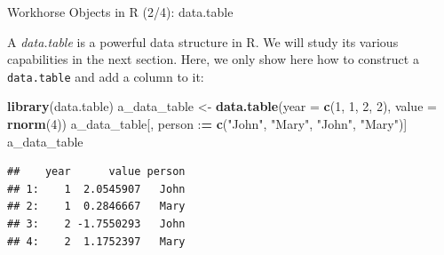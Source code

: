 \documentclass[10pt,ignorenonframetext,]{beamer}
\newenvironment{Shaded}{\begin{snugshade}}{\end{snugshade}}
\newcommand{\KeywordTok}[1]{\textcolor[rgb]{0.13,0.29,0.53}{\textbf{{#1}}}}
\newcommand{\DataTypeTok}[1]{\textcolor[rgb]{0.13,0.29,0.53}{{#1}}}
\newcommand{\DecValTok}[1]{\textcolor[rgb]{0.00,0.00,0.81}{{#1}}}
\newcommand{\StringTok}[1]{\textcolor[rgb]{0.31,0.60,0.02}{{#1}}}
\newcommand{\ErrorTok}[1]{\textcolor[rgb]{0.64,0.00,0.00}{\textbf{{#1}}}}
\newcommand{\NormalTok}[1]{{#1}}
\begin{document}
\begin{frame}[fragile]{Workhorse Objects in R (2/4): data.table}

A \emph{data.table} is a powerful data structure in R. We will study its
various capabilities in the next section. Here, we only show here how to
construct a \texttt{data.table} and add a column to it:

\footnotesize

\begin{Shaded}
\begin{Highlighting}[]
\KeywordTok{library}\NormalTok{(data.table)}
\NormalTok{a_data_table <-}\StringTok{ }\KeywordTok{data.table}\NormalTok{(}\DataTypeTok{year =} \KeywordTok{c}\NormalTok{(}\DecValTok{1}\NormalTok{, }\DecValTok{1}\NormalTok{, }\DecValTok{2}\NormalTok{, }\DecValTok{2}\NormalTok{), }\DataTypeTok{value =} \KeywordTok{rnorm}\NormalTok{(}\DecValTok{4}\NormalTok{))}
\NormalTok{a_data_table[, person :}\ErrorTok{=}\StringTok{ }\KeywordTok{c}\NormalTok{(}\StringTok{"John"}\NormalTok{, }\StringTok{"Mary"}\NormalTok{, }\StringTok{"John"}\NormalTok{, }\StringTok{"Mary"}\NormalTok{)]}
\NormalTok{a_data_table}
\end{Highlighting}
\end{Shaded}

\begin{verbatim}
##    year      value person
## 1:    1  2.0545907   John
## 2:    1  0.2846667   Mary
## 3:    2 -1.7550293   John
## 4:    2  1.1752397   Mary
\end{verbatim}

\normalsize

\end{frame}
\end{document}
